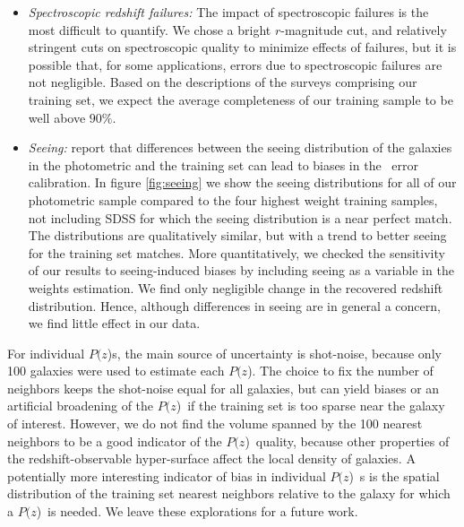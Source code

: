\documentclass[12pt,preprint]{aastex}
\newcommand{\pofz}{$P(z$)}
\begin{document}
\begin{itemize}
\item {\it Spectroscopic redshift failures: } The impact of spectroscopic failures is the
most difficult to quantify.  We chose a bright $r$-magnitude cut, and relatively
stringent cuts on spectroscopic quality to minimize effects of failures, but it
is possible that, for some applications, errors due to spectroscopic failures are not negligible.
Based on the descriptions of the surveys comprising our training set, we expect the average
completeness of our training sample to be well above $90\%$.


\item {\it Seeing: } \citet{Nakajima11} report that differences
between the seeing distribution of the galaxies in the photometric and the
training set can lead to biases in the \photoz\ error calibration.  In figure
\ref{fig:seeing} we show the seeing distributions for all of our photometric
sample compared to the four highest weight training samples, not including SDSS
for which the seeing distribution is a near perfect match.  The distributions
are qualitatively similar, but with a trend to better seeing for the training
set matches.  More quantitatively, we checked the sensitivity of our results to
seeing-induced biases by including seeing as a variable in the weights
estimation.  We find only negligible change in the recovered redshift
distribution.  Hence, although differences in seeing are in general a concern, we
find little effect in our data.
\end{itemize}

For individual \pofz s, the main source of uncertainty is shot-noise, because
only 100 galaxies were used to estimate each \pofz.  The choice to fix the
number of neighbors keeps the shot-noise equal for all galaxies, but can 
yield biases or an artificial broadening of the \pofz\ if the training set is
too sparse near the galaxy of interest.  However, we do not find the volume
spanned by the 100 nearest neighbors to be a good indicator of the \pofz\
quality, because other properties of the redshift-observable
hyper-surface affect the local density of galaxies.  A potentially more
interesting indicator of bias in individual \pofz\ s is the spatial distribution
of the training set nearest neighbors relative to the galaxy for which a \pofz\
is needed.  We leave these explorations for a future work.
\end{document}
